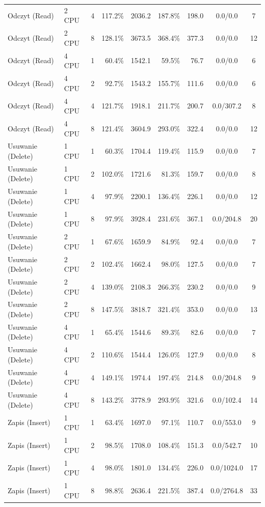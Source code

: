 \begin{table}[ht]
{\begin{tabular}{llcrrrrcc}
Odczyt (Read) & 2 CPU & 4 & 117.2\% & 2036.2 & 187.8\% & 198.0 & 0.0/0.0 & 7 \\
Odczyt (Read) & 2 CPU & 8 & 128.1\% & 3673.5 & 368.4\% & 377.3 & 0.0/0.0 & 12 \\
Odczyt (Read) & 4 CPU & 1 & 60.4\% & 1542.1 & 59.5\% & 76.7 & 0.0/0.0 & 6 \\
Odczyt (Read) & 4 CPU & 2 & 92.7\% & 1543.2 & 155.7\% & 111.6 & 0.0/0.0 & 6 \\
Odczyt (Read) & 4 CPU & 4 & 121.7\% & 1918.1 & 211.7\% & 200.7 & 0.0/307.2 & 8 \\
Odczyt (Read) & 4 CPU & 8 & 121.4\% & 3604.9 & 293.0\% & 322.4 & 0.0/0.0 & 12 \\
Usuwanie (Delete) & 1 CPU & 1 & 60.3\% & 1704.4 & 119.4\% & 115.9 & 0.0/0.0 & 7 \\
Usuwanie (Delete) & 1 CPU & 2 & 102.0\% & 1721.6 & 81.3\% & 159.7 & 0.0/0.0 & 8 \\
Usuwanie (Delete) & 1 CPU & 4 & 97.9\% & 2200.1 & 136.4\% & 226.1 & 0.0/0.0 & 12 \\
Usuwanie (Delete) & 1 CPU & 8 & 97.9\% & 3928.4 & 231.6\% & 367.1 & 0.0/204.8 & 20 \\
Usuwanie (Delete) & 2 CPU & 1 & 67.6\% & 1659.9 & 84.9\% & 92.4 & 0.0/0.0 & 7 \\
Usuwanie (Delete) & 2 CPU & 2 & 102.4\% & 1662.4 & 98.0\% & 127.5 & 0.0/0.0 & 7 \\
Usuwanie (Delete) & 2 CPU & 4 & 139.0\% & 2108.3 & 266.3\% & 230.2 & 0.0/0.0 & 9 \\
Usuwanie (Delete) & 2 CPU & 8 & 147.5\% & 3818.7 & 321.4\% & 353.0 & 0.0/0.0 & 13 \\
Usuwanie (Delete) & 4 CPU & 1 & 65.4\% & 1544.6 & 89.3\% & 82.6 & 0.0/0.0 & 7 \\
Usuwanie (Delete) & 4 CPU & 2 & 110.6\% & 1544.4 & 126.0\% & 127.9 & 0.0/0.0 & 8 \\
Usuwanie (Delete) & 4 CPU & 4 & 149.1\% & 1974.4 & 197.4\% & 214.8 & 0.0/204.8 & 9 \\
Usuwanie (Delete) & 4 CPU & 8 & 143.2\% & 3778.9 & 293.9\% & 321.6 & 0.0/102.4 & 14 \\
Zapis (Insert) & 1 CPU & 1 & 63.4\% & 1697.0 & 97.1\% & 110.7 & 0.0/553.0 & 9 \\
Zapis (Insert) & 1 CPU & 2 & 98.5\% & 1708.0 & 108.4\% & 151.3 & 0.0/542.7 & 10 \\
Zapis (Insert) & 1 CPU & 4 & 98.0\% & 1801.0 & 134.4\% & 226.0 & 0.0/1024.0 & 17 \\
Zapis (Insert) & 1 CPU & 8 & 98.8\% & 2636.4 & 221.5\% & 387.4 & 0.0/2764.8 & 33 \\

\end{tabular}}
\end{table}
